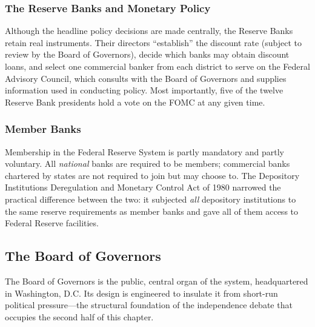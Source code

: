 \subsubsection*{The Reserve Banks and Monetary Policy}

Although the headline policy decisions are made centrally, the Reserve Banks retain real instruments. Their directors ``establish'' the discount rate (subject to review by the Board of Governors), decide which banks may obtain discount loans, and select one commercial banker from each district to serve on the Federal Advisory Council, which consults with the Board of Governors and supplies information used in conducting policy. Most importantly, five of the twelve Reserve Bank presidents hold a vote on the FOMC at any given time.

\subsubsection*{Member Banks}

Membership in the Federal Reserve System is partly mandatory and partly voluntary. All \emph{national} banks are required to be members; commercial banks chartered by states are not required to join but may choose to. The Depository Institutions Deregulation and Monetary Control Act of 1980 narrowed the practical difference between the two: it subjected \emph{all} depository institutions to the same reserve requirements as member banks and gave all of them access to Federal Reserve facilities.

\subsection{The Board of Governors}

The Board of Governors is the public, central organ of the system, headquartered in Washington, D.C. Its design is engineered to insulate it from short-run political pressure---the structural foundation of the independence debate that occupies the second half of this chapter.



